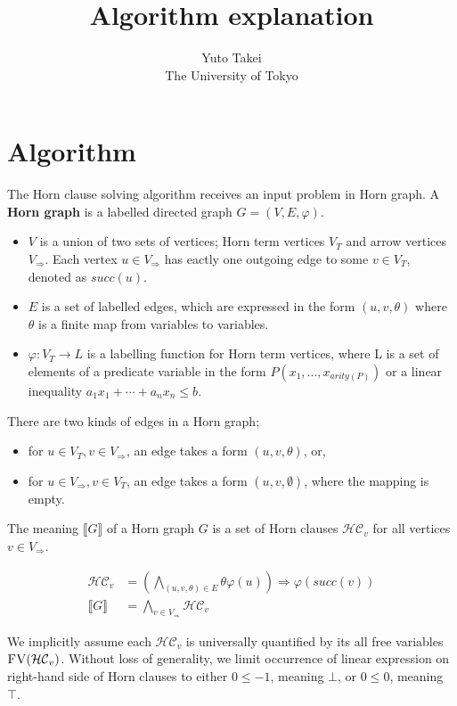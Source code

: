 \documentclass[a4paper,12pt]{article}
\title{Algorithm explanation}
\author{Yuto Takei \\ The University of Tokyo}
\begin{document}
\maketitle

\section{Algorithm}

The Horn clause solving algorithm receives an input problem in Horn
graph. A \textbf{Horn graph} is a labelled directed graph $G=(V,E,\varphi)$.
\begin{itemize}
\item $V$ is a union of two sets of vertices; Horn term vertices $V_T$
  and arrow vertices $V_\Rightarrow$. Each vertex $u \in
  V_\Rightarrow$ has eactly one outgoing edge to some $v \in V_T$,
  denoted as $succ(u)$.
\item $E$ is a set of labelled edges, which are expressed in the form
  $(u,v,\theta)$ where $\theta$ is a finite map from variables to
  variables.
\item $\varphi: V_T \rightarrow L$ is a labelling function for Horn
  term vertices, where L is a set of elements of a predicate variable
  in the form $P(x_1, ..., x_{arity(P)})$ or a linear inequality $a_1
  x_1 + \cdots + a_n x_n \leq b$.
\end{itemize}

There are two kinds of edges in a Horn graph;
\begin{itemize}
\item for $u \in V_T, v \in V_\Rightarrow$, an edge takes a form
  $(u,v,\theta)$, or,
\item for $u \in V_\Rightarrow, v \in V_T$, an edge takes a form
  $(u,v,\emptyset)$, where the mapping is empty.
\end{itemize}

The meaning $\llbracket G \rrbracket $ of a Horn graph $G$ is a set of
Horn clauses $\mathcal{HC}_v$ for all vertices $v \in V_\Rightarrow$.

\begin{align*}
\mathcal{HC}_v & = \left( \bigwedge_{(u,v,\theta) \in E} \theta \varphi(u) \right) \Longrightarrow \varphi(succ(v)) \\
\llbracket G \rrbracket & = \bigwedge_{v \in V_\Rightarrow} \mathcal{HC}_v
\end{align*}

We implicitly assume each $\mathcal{HC}_v$ is universally quantified
by its all free variables $\textsc{FV}(\mathcal{HC}_v)$. Without loss
of generality, we limit occurrence of linear expression on right-hand
side of Horn clauses to either $0 \leq -1$, meaning $\bot$, or $0 \leq
0$, meaning $\top$.
\end{document}
